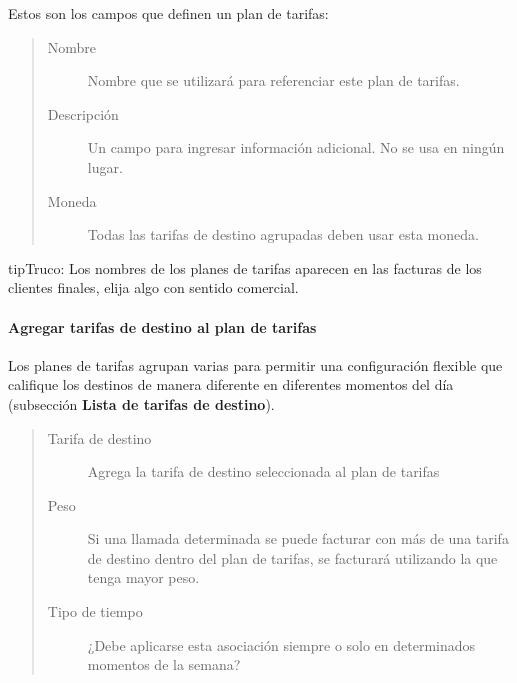 \documentclass[letterpaper,10pt,spanish]{sphinxmanual}
\begin{document}
Estos son los campos que definen un plan de tarifas:
\begin{quote}
\begin{description}
\item[{Nombre}] \leavevmode
Nombre que se utilizará para referenciar este plan de tarifas.

\item[{Descripción}] \leavevmode
Un campo para ingresar información adicional. No se usa en ningún lugar.

\item[{Moneda}] \leavevmode
Todas las tarifas de destino agrupadas deben usar esta moneda.

\end{description}
\end{quote}

\begin{notice}{tip}{Truco:}
Los nombres de los planes de tarifas aparecen en las facturas de los clientes finales, elija algo con sentido comercial.
\end{notice}


\paragraph{Agregar tarifas de destino al plan de tarifas}
\label{administration_portal/brand/billing/rating_plans:adding-destination-rates-to-rating-plan}
Los planes de tarifas agrupan varias {\hyperref[administration_portal/brand/billing/destination_rates:destination\string-rates]{}} para permitir una configuración flexible que califique los destinos de manera diferente en diferentes momentos del día (subsección \textbf{Lista de tarifas de destino}).
\begin{quote}
\begin{description}
\item[{Tarifa de destino}] \leavevmode
Agrega la tarifa de destino seleccionada al plan de tarifas

\item[{Peso}] \leavevmode
Si una llamada determinada se puede facturar con más de una tarifa de destino dentro del plan de tarifas, se facturará utilizando la que tenga mayor peso.

\item[{Tipo de tiempo}] \leavevmode
¿Debe aplicarse esta asociación siempre o solo en determinados momentos de la semana?

\end{description}
\end{quote}
\end{document}

